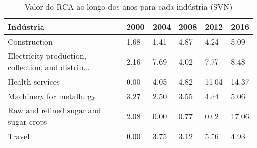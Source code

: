 \begin{table}
\centering
\caption{Valor do RCA ao longo dos anos para cada indústria (SVN)}
\begin{tabular}{p{6cm}p{1.5cm}p{1.5cm}p{1.5cm}p{1.5cm}p{1.5cm}}
\toprule
                                         Indústria & 2000 & 2004 & 2008 &  2012 &  2016 \\
\midrule
                                      Construction & 1.68 & 1.41 & 4.87 &  4.24 &  5.09 \\
Electricity production, collection, and distrib... & 2.16 & 7.69 & 4.02 &  7.77 &  8.48 \\
                                   Health services & 0.00 & 4.05 & 4.82 & 11.04 & 14.37 \\
                          Machinery for metallurgy & 3.27 & 2.50 & 3.55 &  4.34 &  5.06 \\
             Raw and refined sugar and sugar crops & 2.08 & 0.00 & 0.77 &  0.02 & 17.06 \\
                                            Travel & 0.00 & 3.75 & 3.12 &  5.56 &  4.93 \\
\bottomrule
\end{tabular}
\end{table}
